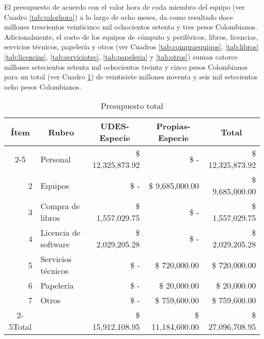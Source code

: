 El presupuesto de acuerdo con el valor hora de cada miembro del equipo (ver Cuadro \ref{tab:valorhora}) a lo largo de ocho meses, da como resultado doce millones trescientos veinticinco mil ochocientos setenta y tres pesos Colombianos. Adicionalmente, el costo  de los equipos de cómputo y periféricos, libros, licencias, servicios técnicos, papelería y otros (ver Cuadros \ref{tab:compraequipos}, \ref{tab:libros} \ref{tab:licencias}, \ref{tab:serviciotec}, \ref{tab:papeleria} y \ref{tab:otros}) suman catorce millones setecientos setenta mil ochocientos treinta y cinco pesos Colombianos para un total (ver Cuadro \ref{tab:presupuesto}) de veintisiete millones noventa y seis mil setecientos ocho pesos Colombianos.

\begin{table}[H]
    \centering
    \caption{Presupuesto total}
    \footnotesize
    \begin{tabular}{crrrr}
        \hline
        Ítem & \multicolumn{1}{c}{Rubro} & \multicolumn{1}{c}{UDES-Especie} & \multicolumn{1}{c}{Propias-Especie} & \multicolumn{1}{c}{Total} \bigstrut\\
        \cline{2-5}\multicolumn{1}{r}{1} & \multicolumn{1}{l}{Personal} &  \$     12,325,873.92  &  \$                           -    &  \$     12,325,873.92  \bigstrut[t]\\
        \multicolumn{1}{r}{2} & \multicolumn{1}{l}{Equipos} &  \$                           -    &  \$       9,685,000.00  &  \$       9,685,000.00  \\
        \multicolumn{1}{r}{3} & \multicolumn{1}{l}{Compra de libros} &  \$       1,557,029.75  &  \$                           -    &  \$       1,557,029.75  \\
        \multicolumn{1}{r}{4} & \multicolumn{1}{l}{Licencia de software} &  \$       2,029,205.28  &  \$                           -    &  \$       2,029,205.28  \\
        \multicolumn{1}{r}{5} & \multicolumn{1}{l}{Servicios técnicos} &  \$                           -    &  \$          720,000.00  &  \$          720,000.00  \\
        \multicolumn{1}{r}{6} & \multicolumn{1}{l}{Papelería} &  \$                           -    &  \$             20,000.00  &  \$             20,000.00  \\
        \multicolumn{1}{r}{7} & \multicolumn{1}{l}{Otros} &  \$                           -    &  \$          759,600.00  &  \$          759,600.00  \bigstrut[b]\\
        \cline{2-5}Total &   &  \$     15,912,108.95  &  \$     11,184,600.00  &  \$     27,096,708.95  \bigstrut\\
        \hline
    \end{tabular}%
  \label{tab:presupuesto}%
\end{table}%

